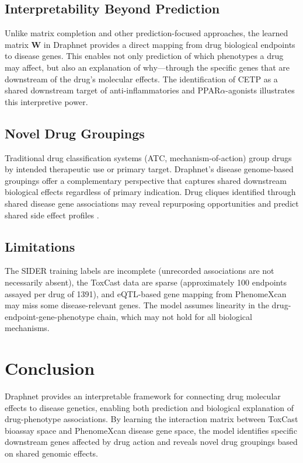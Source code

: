 \documentclass[12pt]{article}
\begin{document}
\subsection{Interpretability Beyond Prediction}

Unlike matrix completion and other prediction-focused approaches, the learned matrix $\mathbf{W}$ in Draphnet provides a direct mapping from drug biological endpoints to disease genes. This enables not only prediction of which phenotypes a drug may affect, but also an explanation of why---through the specific genes that are downstream of the drug's molecular effects. The identification of CETP as a shared downstream target of anti-inflammatories and PPAR$\alpha$-agonists illustrates this interpretive power.

\subsection{Novel Drug Groupings}

Traditional drug classification systems (ATC, mechanism-of-action) group drugs by intended therapeutic use or primary target. Draphnet's disease genome-based groupings offer a complementary perspective that captures shared downstream biological effects regardless of primary indication. Drug cliques identified through shared disease gene associations may reveal repurposing opportunities and predict shared side effect profiles \citep{lamb2006connectivity, subramanian2017lincs}.

\subsection{Limitations}

The SIDER training labels are incomplete (unrecorded associations are not necessarily absent), the ToxCast data are sparse (approximately 100 endpoints assayed per drug of 1391), and eQTL-based gene mapping from PhenomeXcan may miss some disease-relevant genes. The model assumes linearity in the drug-endpoint-gene-phenotype chain, which may not hold for all biological mechanisms.

\section{Conclusion}

Draphnet provides an interpretable framework for connecting drug molecular effects to disease genetics, enabling both prediction and biological explanation of drug-phenotype associations. By learning the interaction matrix between ToxCast bioassay space and PhenomeXcan disease gene space, the model identifies specific downstream genes affected by drug action and reveals novel drug groupings based on shared genomic effects.



\end{document}

